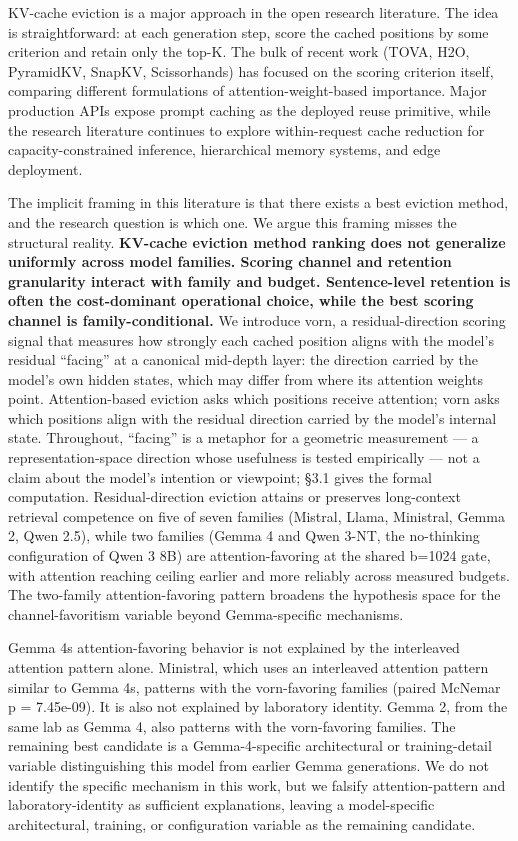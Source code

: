 \documentclass[10pt]{article}
\begin{document}
KV-cache eviction is a major approach in the open research literature.
The idea is straightforward: at each generation step, score the cached
positions by some criterion and retain only the top-K. The bulk of
recent work (TOVA, H2O, PyramidKV, SnapKV, Scissorhands) has focused on
the scoring criterion itself, comparing different formulations of
attention-weight-based importance. Major production APIs expose prompt
caching as the deployed reuse primitive, while the research literature
continues to explore within-request cache reduction for
capacity-constrained inference, hierarchical memory systems, and edge
deployment.

The implicit framing in this literature is that there exists a best
eviction method, and the research question is which one. We argue this
framing misses the structural reality. \textbf{KV-cache eviction
method ranking does not generalize uniformly across model families.
Scoring channel and retention granularity interact with family and
budget. Sentence-level retention is often the cost-dominant
operational choice, while the best scoring channel is
family-conditional.} We introduce vorn, a residual-direction scoring
signal that measures how strongly each cached position aligns with the
model's residual ``facing'' at a canonical mid-depth layer: the
direction carried by the model's own hidden states, which may differ
from where its attention weights point. Attention-based eviction asks
which positions receive attention; vorn asks which positions align
with the residual direction carried by the model's internal state.
Throughout, ``facing'' is a metaphor for a geometric measurement --- a
representation-space direction whose usefulness is tested empirically
--- not a claim about the model's intention or viewpoint; \S{}3.1 gives
the formal computation. Residual-direction eviction
attains or preserves long-context retrieval competence on five of seven
families (Mistral, Llama, Ministral, Gemma 2, Qwen 2.5), while two
families (Gemma 4 and Qwen 3-NT, the no-thinking configuration of
Qwen 3 8B) are attention-favoring at the shared b=1024 gate, with
attention reaching ceiling earlier and more reliably across measured
budgets. The two-family attention-favoring pattern broadens the
hypothesis space for the channel-favoritism variable beyond
Gemma-specific mechanisms.

Gemma 4\textquotesingle s attention-favoring behavior is not explained
by the interleaved attention pattern alone. Ministral, which uses an interleaved attention pattern
similar to Gemma 4\textquotesingle s, patterns with the
vorn-favoring families (paired McNemar p = 7.45e-09). It
is also not explained by laboratory identity. Gemma 2, from the same
lab as Gemma 4, also patterns with the vorn-favoring
families. The remaining best candidate is a Gemma-4-specific
architectural or training-detail variable distinguishing this model from
earlier Gemma generations. We do not identify the specific mechanism in
this work, but we falsify attention-pattern and laboratory-identity as
sufficient explanations, leaving a model-specific architectural,
training, or configuration variable as the remaining candidate.
\end{document}
